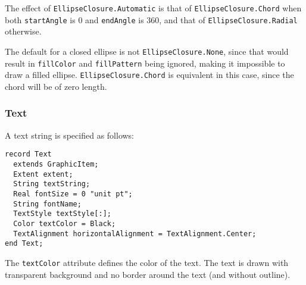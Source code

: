The effect of \lstinline!EllipseClosure.Automatic! is that of \lstinline!EllipseClosure.Chord! when both \lstinline!startAngle! is 0 and \lstinline!endAngle! is 360, and that of \lstinline!EllipseClosure.Radial! otherwise.

\begin{nonnormative}
The default for a closed ellipse is not \lstinline!EllipseClosure.None!, since that would result in \lstinline!fillColor! and \lstinline!fillPattern! being ignored, making it impossible to draw a filled ellipse.
\lstinline!EllipseClosure.Chord! is equivalent in this case, since the chord will be of zero length.
\end{nonnormative}

\subsubsection{Text}\label{text}

A text string is specified as follows:
\begin{lstlisting}[language=modelica]
record Text
  extends GraphicItem;
  Extent extent;
  String textString;
  Real fontSize = 0 "unit pt";
  String fontName;
  TextStyle textStyle[:];
  Color textColor = Black;
  TextAlignment horizontalAlignment = TextAlignment.Center;
end Text;
\end{lstlisting}%
The \lstinline!textColor! attribute defines the color of the text.
The text is drawn with transparent background and no border around the text (and without outline).

